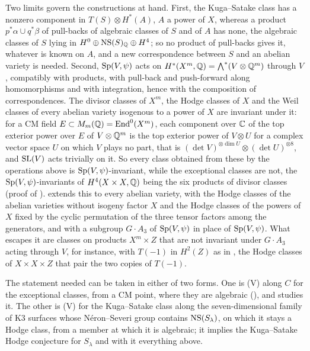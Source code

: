 \begin{remark}
Two limits govern the constructions at hand.
First, the Kuga--Satake class has a nonzero component in $T(S)\otimes
H^{*}(A)$, $A$ a power of $X$, whereas a product $p^{*}\alpha\cup q^{*}\beta$
of pull-backs of algebraic classes of $S$ and of $A$ has none, the algebraic
classes of $S$ lying in $H^{0}\oplus\mathrm{NS}(S)_{\mathbb{Q}}\oplus H^{4}$; so no product
of pull-backs gives it, whatever is known on $A$, and a new correspondence
between $S$ and an abelian variety is needed. Second, $\operatorname{Sp}(V,\psi)$ acts on
$H^{*}(X^{m},\mathbb{Q})=\bigwedge^{*}(V\otimes\mathbb{Q}^{m})$ through $V$, compatibly with
products, with pull-back and push-forward along homomorphisms and with
integration, hence with the composition of correspondences. The divisor
classes of $X^{m}$, the Hodge classes of $X$ and the Weil classes of every
abelian variety isogenous to a power of $X$ are invariant under it: for a CM
field $E\subset M_{m}(\mathbb{Q})=\operatorname{End}^{0}(X^{m})$, each component over $\mathbb{C}$ of
the top exterior power over $E$ of $V\otimes\mathbb{Q}^{m}$ is the top exterior power
of $V\otimes U$ for a complex vector space $U$ on which $V$ plays no part,
that is $(\det V)^{\otimes\dim U}\otimes(\det U)^{\otimes8}$, and $\operatorname{SL}(V)$ acts
trivially on it. So every class obtained from these by the operations
above is $\operatorname{Sp}(V,\psi)$-invariant, while the exceptional classes are not, the
$\operatorname{Sp}(V,\psi)$-invariants of $H^{4}(X\times X,\mathbb{Q})$ being the six products of
divisor classes (proof of ).
 extends this to every abelian variety, with the
Hodge classes of the abelian varieties without isogeny factor $X$ and the
Hodge classes of the powers of $X$ fixed by the cyclic permutation of the
three tensor factors among the generators, and with a subgroup $G\cdot A_{3}$
of $\operatorname{Sp}(V,\psi)$ in place of $\operatorname{Sp}(V,\psi)$. What escapes it are classes on
products $X^{m}\times Z$ that are not invariant under $G\cdot A_{3}$ acting
through $V$, for instance, with $T(-1)$ in $H^{2}(Z)$ as in
, the Hodge classes of $X\times X\times Z$ that pair
the two copies of $T(-1)$.

The statement needed can be taken in either of two forms. One is \textup{(V)} along $C$ for the exceptional classes, from a
CM point, where they are algebraic (), and
 studies it. The other
is \textup{(V)} for the Kuga--Satake class along the seven-dimensional family
of K3 surfaces whose N\'eron--Severi group contains $\mathrm{NS}(S_{\lambda})$, on
which it stays a Hodge class, from a member at which it is algebraic; it
implies the Kuga--Satake Hodge conjecture for $S_{\lambda}$ and with it
everything above.


\end{remark}
